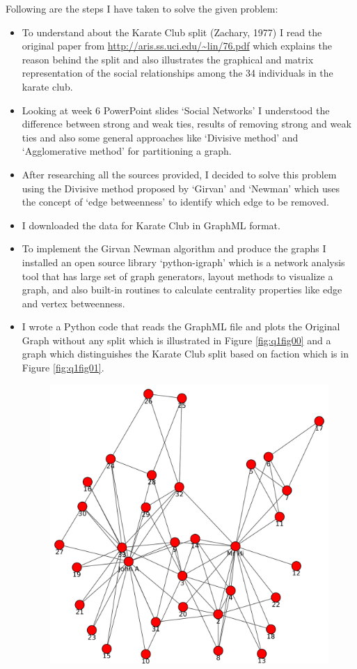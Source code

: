 \newpage
Following are the steps I have taken to solve the given problem:
\begin{itemize}
\item To understand about the Karate Club split (Zachary, 1977) I read the original paper from \url{http://aris.ss.uci.edu/~lin/76.pdf} which explains the reason behind the split and also illustrates the graphical and matrix representation of the social relationships among the 34 individuals in the karate club.
\item Looking at week 6 PowerPoint slides `Social Networks' I understood the difference between strong and weak ties, results of removing strong and weak ties and also some general approaches like `Divisive method' and `Agglomerative method' for partitioning a graph.
\item After researching all the sources provided, I decided to solve this problem using the Divisive method proposed by `Girvan' and `Newman' which uses the concept of `edge betweenness' to identify which edge to be removed.
\item I downloaded the data for Karate Club in GraphML format.
\item To implement the Girvan Newman algorithm and produce the graphs I installed an open source library `python-igraph' which is a network analysis tool that has large set of graph generators, layout methods to visualize a graph, and also built-in routines to calculate centrality properties like edge and vertex betweenness. 
\newpage
\item I wrote a Python code that reads the GraphML file and plots the Original Graph without any split which is illustrated in Figure \ref{fig:q1fig00} and a graph which distinguishes the Karate Club split based on faction which is in Figure \ref{fig:q1fig01}.
\begin{figure}[h!]
\begin{center}
\includegraphics[scale=0.55, keepaspectratio=true]{figures/graphs/OriginalGraph.pdf}

\end{center}
\end{figure}
\end{itemize}
